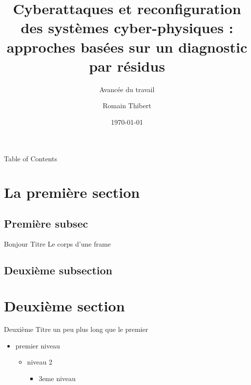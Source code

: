 \documentclass[aspectratio=169]{beamer}
\title{Cyberattaques et reconfiguration des systèmes cyber-physiques : approches basées sur un diagnostic par résidus}
\subtitle{Avancée du travail}
\author[R. Thibert]{Romain Thibert}
\date[2022]{\today}
\begin{document}
\frame{\titlepage}

\begin{frame}{Table of Contents}
\tableofcontents
\end{frame}

\section{La première section}

\subsection{Première subsec}

\begin{frame}{Bonjour Titre}
Le corps d'une frame
\end{frame}

\subsection{Deuxième subsection}

\section{Deuxième section}

\begin{frame}{Deuxième Titre un peu plus long que le premier}
\begin{itemize}
    \item premier niveau
    \begin{itemize}
        \item niveau 2
        \begin{itemize}
            \item 3eme niveau
        \end{itemize}
    \end{itemize}
\end{itemize}
\end{frame}
\end{document}
